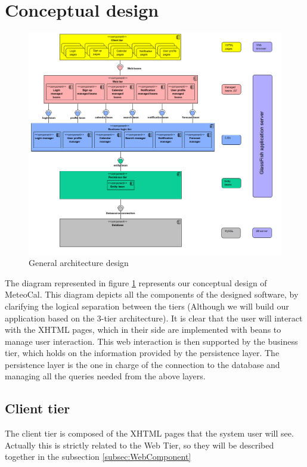 \documentclass[10pt,a4paper,titlepage]{article}
\begin{document}
\section{Conceptual design}
\label{sec:conceptual-design}
\begin{figure}[h!]
\centering
\includegraphics[width=\linewidth]{./images/general_architecture_design}
\caption[General architecture]{General architecture design}
\label{fig:general-architecture}
\end{figure}

The diagram represented in figure \ref{fig:general-architecture} represents our conceptual design of MeteoCal. This diagram depicts all the components of the designed software, by clarifying the logical separation between the tiers (Although we will build our application based on the 3-tier architecture).
It is clear that the user will interact with the XHTML pages, which in their side are implemented with beans to manage user interaction. This web interaction is then supported by the business tier, which holds on the information provided by the persistence layer. The persistence layer is the one in charge of the connection to the database and managing all the queries needed from the above layers.

\subsection{Client tier}
The client tier is composed of the XHTML pages that the system user will see. Actually this is strictly related to the Web Tier, so they will be described together in the subsection \ref{subsec:WebComponent}
\end{document}
